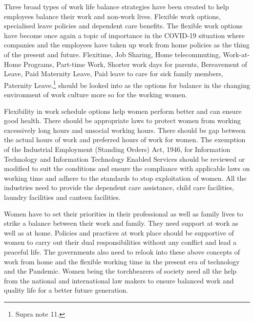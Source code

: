 \begin{multicols}{2}
\noi
Three broad types of work life balance strategies have been created to help employees
balance their work and non-work lives. Flexible work options, specialised leave policies and
dependent care benefits. The flexible work options have become once again a topic of
importance in the COVID-19 situation where companies and the employees have taken up
work from home policies as the thing of the present and future. Flexitime, Job Sharing, Home
telecommuting, Work-at-Home Programs, Part-time Work, Shorter work days for parents,
Bereavement of Leave, Paid Maternity Leave, Paid leave to care for sick family members,
Paternity Leave.\footnote{Supra note 11.} should be looked into as the options for balance in the changing
environment of work culture more so for the working women.

\noi
Flexibility in work schedule options help women perform better and can ensure good health.
There should be appropriate laws to protect women from working excessively long hours and
unsocial working hours. There should be gap between the actual hours of work and preferred
hours of work for women. The exemption of the Industrial Employment (Standing Orders)
Act, 1946, for Information Technology and Information Technology Enabled Services should
be reviewed or modified to suit the conditions and ensure the compliance with applicable
laws on working time and adhere to the standards to stop exploitation of women. All the industries need to provide the dependent care assistance, child care facilities, laundry facilities and canteen facilities. 

\noi
Women have to set their priorities in their professional as well as family lives to strike a
balance between their work and family. They need support at work as well as at home.
Policies and practices at work place should be supportive of women to carry out their dual
responsibilities without any conflict and lead a peaceful life. The governments also need to
relook into these above concepts of work from home and the flexible working time in the
present era of technology and the Pandemic. Women being the torchbearers of society need
all the help from the national and international law makers to ensure balanced work and
quality life for a better future generation.

\label{end2020-art10}

\end{multicols}

\newpage

\vskip 3cm

